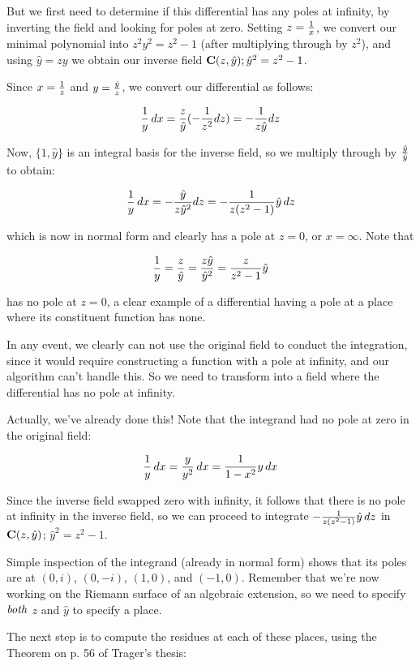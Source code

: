 But we first need to determine if this differential has any poles at
infinity, by inverting the field and looking for poles at zero.
Setting $z={1\over x}$, we convert our minimal polynomial into
$z^2y^2=z^2-1$ (after multiplying through by $z^2$), and using
$\hat{y}=zy$ we obtain our inverse field ${\bf C}(z,\hat{y}); \hat{y}^2=z^2-1$.

Since $x={1\over z}$ and $y={\hat{y}\over z}$, we convert our differential as follows:

 $${1\over y}\,dx ={z\over\hat{y}} (-{1\over{z^2}} dz) = -{1\over{z\hat{y}}} dz$$

Now, $\{1, \hat{y}\}$ is an integral basis for the inverse field, so we
multiply through by $\hat{y}\over\hat{y}$ to obtain:

 $${1\over y}\,dx = -{\hat{y}\over{z\hat{y}^2}} dz = -{1\over{z(z^2-1)}}\hat{y} \, dz $$

which is now in normal form and clearly has a pole at $z=0$, or $x=\infty$.  Note that

 $${1\over y} = {z\over\hat{y}} = {{z\hat{y}}\over{\hat{y}^2}}
 = {z\over{z^2-1}} \hat{y}$$

has no pole at $z=0$, a clear example of a differential having a pole
at a place where its constituent function has none.

In any event, we clearly can not use the original field to conduct the
integration, since it would require constructing a function with a
pole at infinity, and our algorithm can't handle this.  So we need to
transform into a field where the differential has no pole at infinity.

Actually, we've already done this!  Note that the integrand had no pole
at zero in the original field:

 $${1\over y}\,dx = {y\over y^2}\,dx = {1\over{1-x^2}}y \,dx $$

Since the inverse field swapped zero with infinity, it follows that
there is no pole at infinity in the inverse field, so we can proceed
to integrate $-{1\over{z(z^2-1)}}\hat{y} \,dz$ in ${\bf C}(z,\hat{y})$;
$\hat{y}^2=z^2-1$.

Simple inspection of the integrand (already in normal form) shows that
its poles are at $(0, i)$, $(0, -i)$, $(1, 0)$, and $(-1, 0)$.
Remember that we're now working on the Riemann surface of an algebraic
extension, so we need to specify $\it both$ $z$ and $\hat{y}$ to
specify a place.

The next step is to compute the residues at each of these places,
using the Theorem on p. 56 of Trager's thesis:

